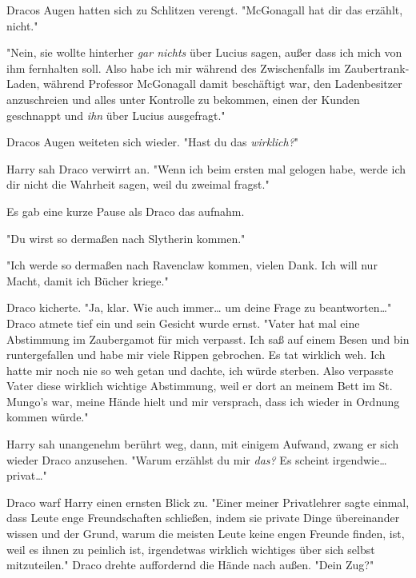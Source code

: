 {Dracos Augen hatten sich zu Schlitzen verengt. "McGonagall hat dir das erzählt, nicht."

"Nein, sie wollte hinterher \emph{gar nichts} über Lucius sagen, außer dass ich mich von ihm fernhalten soll. Also habe ich mir während des Zwischenfalls im Zaubertrank-Laden, während Professor McGonagall damit beschäftigt war, den Ladenbesitzer anzuschreien und alles unter Kontrolle zu bekommen, einen der Kunden geschnappt und \emph{ihn} über Lucius ausgefragt."

Dracos Augen weiteten sich wieder. "Hast du das \emph{wirklich?}"

Harry sah Draco verwirrt an. "Wenn ich beim ersten mal gelogen habe, werde ich dir nicht die Wahrheit sagen, weil du zweimal fragst."

Es gab eine kurze Pause als Draco das aufnahm.

"Du wirst so dermaßen nach Slytherin kommen."

"Ich werde so dermaßen nach Ravenclaw kommen, vielen Dank. Ich will nur Macht, damit ich Bücher kriege."

Draco kicherte. "Ja, klar. Wie auch immer… um deine Frage zu beantworten…" Draco atmete tief ein und sein Gesicht wurde ernst. "Vater hat mal eine Abstimmung im Zaubergamot für mich verpasst. Ich saß auf einem Besen und bin runtergefallen und habe mir viele Rippen gebrochen. Es tat wirklich weh. Ich hatte mir noch nie so weh getan und dachte, ich würde sterben. Also verpasste Vater diese wirklich wichtige Abstimmung, weil er dort an meinem Bett im St. Mungo's war, meine Hände hielt und mir versprach, dass ich wieder in Ordnung kommen würde."

Harry sah unangenehm berührt weg, dann, mit einigem Aufwand, zwang er sich wieder Draco anzusehen. "Warum erzählst du mir \emph{das?} Es scheint irgendwie… privat…"

Draco warf Harry einen ernsten Blick zu. "Einer meiner Privatlehrer sagte einmal, dass Leute enge Freundschaften schließen, indem sie private Dinge übereinander wissen und der Grund, warum die meisten Leute keine engen Freunde finden, ist, weil es ihnen zu peinlich ist, irgendetwas wirklich wichtiges über sich selbst mitzuteilen." Draco drehte auffordernd die Hände nach außen. "Dein Zug?"

}
